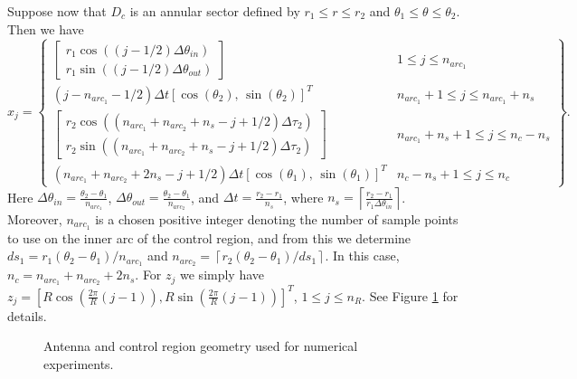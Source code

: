 \documentclass[11pt]{amsart}
\theoremstyle{definition}
\theoremstyle{definition}
\theoremstyle{definition}
\newcommand{\ceiling}[1]{\left\lceil#1\right\rceil}
\newcommand{\paren}[1]{\left ( #1\right )}
\begin{document}
Suppose now that $D_{c}$ is an annular sector defined by $r_{1} \leq r \leq r_{2}$ and $\theta_{1} \leq \theta \leq \theta_{2}$. Then we have
\begin{equation*}
x_{j} = \left\{ \begin{array}{rl}
\left[ \begin{array}{r}
r_{1}\cos\paren{(j-1/2)\Delta \theta_{in}}\\
r_{1}\sin\paren{(j-1/2)\Delta \theta_{out}} \end{array}\right] & 1 \leq j \leq n_{arc_1}\\
(j-n_{arc_1} - 1/2)\Delta t[\cos(\theta_{2}), \, \sin(\theta_{2})]^{T} &  n_{arc_1} + 1 \leq j \leq n_{arc_1} + n_{s}\\
\left[\begin{array}{r} r_{2}\cos\paren{(n_{arc_1}+n_{arc_2}+n_{s}-j+1/2)\Delta \tau_{2}}\\
 r_{2}\sin\paren{(n_{arc_1}+n_{arc_2}+n_{s}-j+1/2)\Delta \tau_{2}} \end{array}\right] & n_{arc_1} + n_{s} + 1 \leq j \leq n_{c} - n_{s}\\
(n_{arc_1}+n_{arc_2} + 2n_{s} - j + 1/2)\Delta t[\cos(\theta_{1}), \,\sin(\theta_{1})]^{T} & n_{c} - n_{s}+ 1 \leq j \leq n_{c} \end{array}\right\}.
\end{equation*}
Here $\Delta \theta_{in} = \frac{\theta_{2} - \theta_{1}}{n_{arc_1}}$, $\Delta \theta_{out} = \frac{\theta_{2} - \theta_{1}}{n_{arc_2}}$, and $\Delta t = \frac{r_{2} - r_{1}}{n_{s}}$, where $n_{s} = \ceiling{\frac{r_{2} - r_{1}}{r_{1}\Delta \theta_{in}}}$. Moreover, $n_{arc_{1}}$ is a chosen positive integer denoting the number of sample points to use on the inner arc of the control region, and from this we determine $ds_1 = r_{1}(\theta_{2} - \theta_{1})/n_{arc_1}$ and $n_{arc_2} = \ceiling{r_{2}(\theta_{2}-\theta_{1})/ds_{1}}$. In this case, $n_{c} = n_{arc_1}+n_{arc_2} + 2n_{s}$. For $z_{j}$ we simply have $z_{j} = [R\cos\paren{\frac{2\pi}{R}(j-1)}, R\sin\paren{\frac{2\pi}{R}(j-1)}]^{T}$, $1 \leq j \leq n_{R}$. See Figure \ref{fig:numericssetup} for details.
\begin{figure}
\centering
\def \svgwidth{0.6\linewidth}

\caption{Antenna and control region geometry used for numerical experiments.}\label{fig:numericssetup}
\end{figure}
\end{document}
